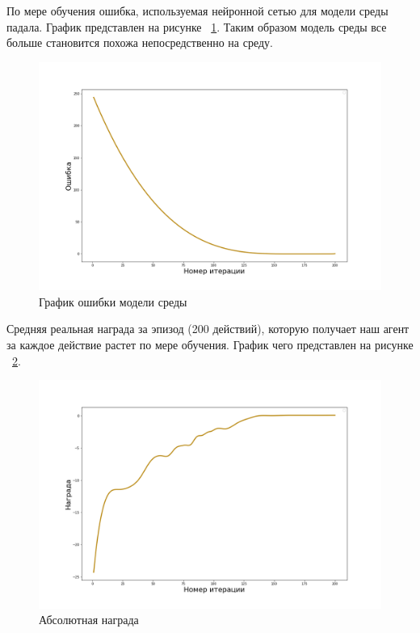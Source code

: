 \newpage
По мере обучения ошибка, используемая нейронной сетью для модели среды падала. График представлен на рисунке ~\ref{fig:loss}. Таким образом модель среды все больше становится похожа непосредственно на среду. 


\begin{figure}[!htb]
	\centering
	\includegraphics[scale=0.5]{loss.png}
	\caption {График ошибки модели среды}
	\label{fig:loss}
\end{figure}

Средняя реальная награда за эпизод (200 действий), которую получает наш агент за каждое действие растет по мере обучения. График чего представлен на рисунке ~\ref{fig:rew}.  \newpage


\begin{figure}[!htb]
	\centering
	\includegraphics[scale=0.5]{rew.png}
	\caption {Абсолютная награда}
	\label{fig:rew}
\end{figure}



